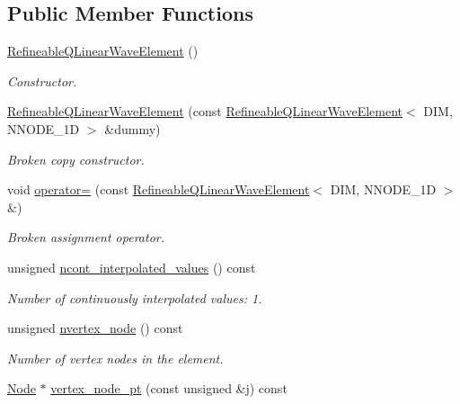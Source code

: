 \subsection*{Public Member Functions}
\begin{DoxyCompactItemize}
\item 
\hyperlink{classoomph_1_1RefineableQLinearWaveElement_adface8f8f8323043b4ad68efb53897be}{Refineable\+Q\+Linear\+Wave\+Element} ()
\begin{DoxyCompactList}\small\item\em Constructor. \end{DoxyCompactList}\item 
\hyperlink{classoomph_1_1RefineableQLinearWaveElement_a947a2c1099d74f97e2467c94d99c6054}{Refineable\+Q\+Linear\+Wave\+Element} (const \hyperlink{classoomph_1_1RefineableQLinearWaveElement}{Refineable\+Q\+Linear\+Wave\+Element}$<$ D\+IM, N\+N\+O\+D\+E\+\_\+1D $>$ \&dummy)
\begin{DoxyCompactList}\small\item\em Broken copy constructor. \end{DoxyCompactList}\item 
void \hyperlink{classoomph_1_1RefineableQLinearWaveElement_a6e64a081bb96e0e14982d8fa9b678d5a}{operator=} (const \hyperlink{classoomph_1_1RefineableQLinearWaveElement}{Refineable\+Q\+Linear\+Wave\+Element}$<$ D\+IM, N\+N\+O\+D\+E\+\_\+1D $>$ \&)
\begin{DoxyCompactList}\small\item\em Broken assignment operator. \end{DoxyCompactList}\item 
unsigned \hyperlink{classoomph_1_1RefineableQLinearWaveElement_ab776eb586ecad308a21a2b10e99936f3}{ncont\+\_\+interpolated\+\_\+values} () const
\begin{DoxyCompactList}\small\item\em Number of continuously interpolated values\+: 1. \end{DoxyCompactList}\item 
unsigned \hyperlink{classoomph_1_1RefineableQLinearWaveElement_a79ebae3de0485161b4d47c904530ae85}{nvertex\+\_\+node} () const
\begin{DoxyCompactList}\small\item\em Number of vertex nodes in the element. \end{DoxyCompactList}\item 
\hyperlink{classoomph_1_1Node}{Node} $\ast$ \hyperlink{classoomph_1_1RefineableQLinearWaveElement_ae459213712a5be1584dc3ed02d3991ec}{vertex\+\_\+node\+\_\+pt} (const unsigned \&j) const

\end{DoxyCompactItemize}
